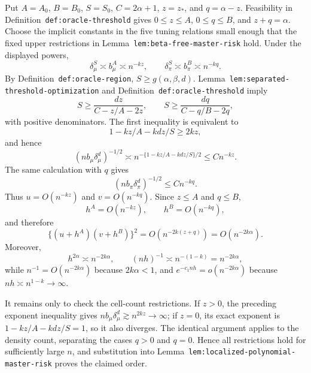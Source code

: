 Put \(A=A_0\), \(B=B_0\), \(S=S_0\), \(C=2\alpha+1\), \(z=z_*\), and \(q=\alpha-z\). Feasibility in Definition~\texttt{def:oracle-threshold} gives \(0\le z\le A\), \(0\le q\le B\), and \(z+q=\alpha\). Choose the implicit constants in the five tuning relations small enough that the fixed upper restrictions in Lemma~\texttt{lem:beta-free-master-risk} hold. Under the displayed powers,
\[
\delta_\mu^S\asymp b_\mu^A\asymp n^{-kz},
\qquad
\delta_\pi^S\asymp b_\pi^B\asymp n^{-kq}.
\]
By Definition~\texttt{def:oracle-region}, \(S\ge g(\alpha,\beta,d)\). Lemma~\texttt{lem:separated-threshold-optimization} and Definition~\texttt{def:oracle-threshold} imply
\[
S\ge \frac{dz}{C-z/A-2z},
\qquad
S\ge \frac{dq}{C-q/B-2q},
\]
with positive denominators. The first inequality is equivalent to
\[
1-kz/A-kdz/S\ge2kz,
\]
and hence
\[
(nb_\mu\delta_\mu^d)^{-1/2}
\asymp n^{-\{1-kz/A-kdz/S\}/2}
\le Cn^{-kz}.
\]
The same calculation with \(q\) gives
\[
(nb_\pi\delta_\pi^d)^{-1/2}\le Cn^{-kq}.
\]
Thus \(u=O(n^{-kz})\) and \(v=O(n^{-kq})\). Since \(z\le A\) and \(q\le B\),
\[
h^A=O(n^{-kz}),
\qquad
h^B=O(n^{-kq}),
\]
and therefore
\[
\{(u+h^A)(v+h^B)\}^2
=O(n^{-2k(z+q)})=O(n^{-2k\alpha}).
\]
Moreover,
\[
h^{2\alpha}\asymp n^{-2k\alpha},
\qquad
(nh)^{-1}\asymp n^{-(1-k)}=n^{-2k\alpha},
\]
while \(n^{-1}=O(n^{-2k\alpha})\) because \(2k\alpha<1\), and \(e^{-c_1nh}=o(n^{-2k\alpha})\) because \(nh\asymp n^{1-k}\to\infty\).

It remains only to check the cell-count restrictions. If \(z>0\), the preceding exponent inequality gives \(nb_\mu\delta_\mu^d\gtrsim n^{2kz}\to\infty\); if \(z=0\), its exact exponent is \(1-kz/A-kdz/S=1\), so it also diverges. The identical argument applies to the density count, separating the cases \(q>0\) and \(q=0\). Hence all restrictions hold for sufficiently large \(n\), and substitution into Lemma~\texttt{lem:localized-polynomial-master-risk} proves the claimed order.